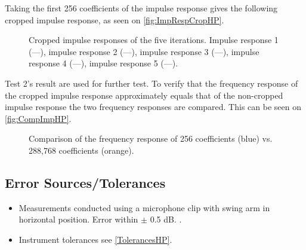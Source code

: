 Taking the first 256 coefficients of the impulse response gives the following cropped impulse response, as seen on \autoref{fig:ImpRespCropHP}.

\begin{figure}[H]
	\centering
	
	\caption{Cropped impulse responses of the five iterations. Impulse response 1 (\textcolor{MATLABblue}{---}), 
	impulse response 2 (\textcolor{MATLABorange}{---}), 	
	impulse response 3 (\textcolor{MATLAByellow}{---}), 	
	impulse response 4 (\textcolor{MATLABpurple}{---}), 	
	impulse response 5 (\textcolor{MATLABgreen}{---}).}
	\label{fig:ImpRespCropHP}
\end{figure}

Test 2's result are used for further test. To verify that the frequency response of the cropped impulse response approximately equals that of the non-cropped impulse response the two frequency responses are compared. This can be seen on \autoref{fig:CompImpHP}.

\begin{figure}[H]
	\centering
	
	\caption{Comparison of the frequency response of 256 coefficients (blue) vs. 288,768 coefficients (orange).}
	\label{fig:CompImpHP}
\end{figure}



\subsection{Error Sources/Tolerances}
\begin{itemize}
	\item Measurements conducted using a microphone clip with swing arm in horizontal position. Error within $\pm$ 0.5 dB. \citep{BK1985}. 
	\item Instrument tolerances see \autoref{TolerancesHP}.
\end{itemize}

